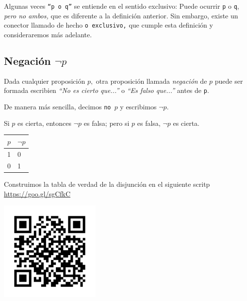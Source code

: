  \begin{rem}
  Algunas veces \texttt{``p o q''} se entiende en el sentido exclusivo: Puede ocurrir \texttt{p} o \texttt{q}, \emph{pero no ambos,} que es diferente a la definici\'on anterior. Sin embargo, existe un conector llamado de hecho \texttt{o exclusivo,} que cumple esta definici\'on y consideraremos m\'as adelante. 
 \end{rem}



\subsection{Negaci\'on $\neg p$}


 Dada cualquier proposici\'on $p,$ otra proposici\'on llamada \emph{negaci\'on} de $p$ puede ser formada escribien \emph{``No es cierto que...''} o \emph{``Es falso que...''} antes de \texttt{p}.
 
 De manera m\'as sencilla, decimos \texttt{no $p$} y escribimos $\neg p.$



 
\begin{defn}[Negaci\'on]
 Si $p$ es cierta, entonces $\neg p$ es falsa; pero si $p$ es falsa, $\neg p$ es cierta.
\end{defn}




    \begin{tdv}[Negaci\'on]
        \label{tdv:not}
        \begin{center}
            \begin{tabular}{|l|l|}\hline
                $p$ & $\neg p$\\\hline
                1 & 0 \\\hline
                0 & 1 \\\hline
            \end{tabular}
        \end{center}
        
    \end{tdv}
    



    Construimos la tabla de verdad de la disjunci\'on en el siguiente scritp \href{https://cloud.sagemath.com/projects/12787063-cafe-4f3b-a2e0-905f8b83cf3b/files/MD01_TDV03_NOT.sagews}{https://goo.gl/sgCfkC}
    \begin{center}
        \includegraphics[height=5cm,keepaspectratio=true]{./md/MD01_TDV03_NOT.png}
    \end{center}
    


